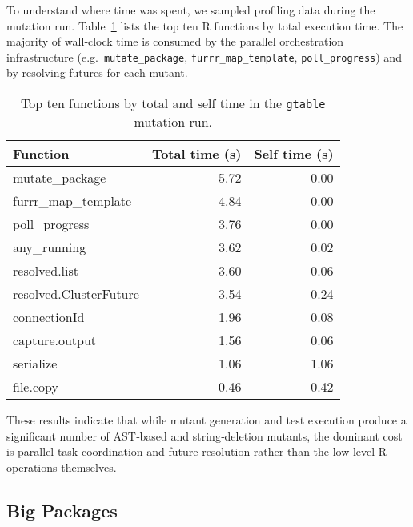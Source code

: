To understand where time was spent, we sampled profiling data during the mutation run.  Table~\ref{tab:gtable-profile} lists the top ten R functions by total execution time.  The majority of wall‐clock time is consumed by the parallel orchestration infrastructure (e.g.\ \texttt{mutate\_package}, \texttt{furrr\_map\_template}, \texttt{poll\_progress}) and by resolving futures for each mutant.

\begin{table}[htbp]
  \centering
  \begin{tabular}{lrr}
    \toprule
    Function                   & Total time (s) & Self time (s) \\
    \midrule
    mutate\_package             & 5.72           & 0.00          \\
    furrr\_map\_template         & 4.84           & 0.00          \\
    poll\_progress              & 3.76           & 0.00          \\
    any\_running                & 3.62           & 0.02          \\
    resolved.list               & 3.60           & 0.06          \\
    resolved.ClusterFuture      & 3.54           & 0.24          \\
    connectionId                & 1.96           & 0.08          \\
    capture.output              & 1.56           & 0.06          \\
    serialize                   & 1.06           & 1.06          \\
    file.copy                   & 0.46           & 0.42          \\
    \bottomrule
  \end{tabular}
  \caption{Top ten functions by total and self time in the \texttt{gtable} mutation run.}
  \label{tab:gtable-profile}
\end{table}

These results indicate that while mutant generation and test execution produce a significant number of AST‐based and string‐deletion mutants, the dominant cost is parallel task coordination and future resolution rather than the low‐level R operations themselves.

\subsection{Big Packages}

